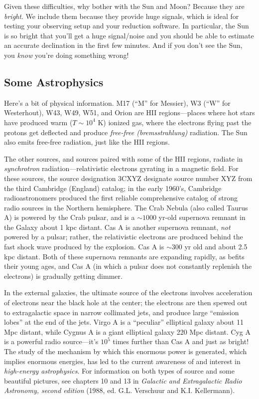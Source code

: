 \documentclass[11pt,preprint]{aastex}
\begin{document}
	Given these difficulties, why bother with the Sun and Moon?
Because they are {\it bright}. We include them because they provide huge
signals, which is ideal for testing your observing setup and your
reduction software.  In particular, the Sun is so bright that you'll get
a huge signal/noise and you should be able to estimate an accurate
declination in the first few minutes. And if you don't see the Sun, you
{\it know} you're doing something wrong!

\subsection{Some Astrophysics}

Here's a bit of physical information.  M17 (``M'' for Messier), W3
(``W'' for Westerhout), W43, W49, W51, and Orion
are HII regions---places where hot stars have produced warm ($T \sim
10^4$ K) ionized gas, where the electrons flying past the protons get
deflected and produce {\it free-free (bremsstrahlung)} radiation.  The
Sun also emits free-free radiation, just like the HII regions.

The other sources, and sources paired with some of the HII regions,
radiate in {\it synchrotron} radiation---relativistic electrons gyrating
in a magnetic field.  For these sources, the source designation 3CXYZ
designate source number XYZ from the third Cambridge (England) catalog;
in the early 1960's, Cambridge radioastronomers produced the first
reliable comprehensive catalog of strong radio sources in the Northern
hemisphere.  The Crab Nebula (also called Taurus A) is powered by the
Crab pulsar, and is a $\sim 1000$ yr-old supernova remnant in the Galaxy
about 1 kpc distant. Cas A is another supernova remnant, {\it not}
powered by a pulsar; rather, the relativistic electrons are produced
behind the fast shock wave produced by the explosion.  Cas A is $\sim
300$ yr old and about 2.5 kpc distant.  Both of these supernova remnants
are expanding rapidly, as befits their young ages, and Cas A (in which a
pulsar does not constantly replenish the electrons) is gradually getting
dimmer.

In the external galaxies, the ultimate source of the
electrons involves acceleration of electrons near the black hole at the
center; the electrons are then spewed out to extragalactic space in
narrow collimated jets, and produce large ``emission lobes'' at the end
of the jets.  Virgo A is a ``peculiar''
elliptical galaxy about 11 Mpc distant, while Cygnus A is a giant
elliptical galaxy 220 Mpc distant.  Cyg A is a powerful radio
source---it's $10^5$ times further than Cas A and just as bright! The
study of the mechanism by which this enormous power is generated, which
implies enormous energies, has led to the current awareness of and
interest in {\it high-energy astrophysics}.
For information on both types of source and some beautiful
pictures, see chapters 10 and 13 in {\it Galactic and Extragalactic
Radio Astronomy, second edition} (1988, ed.  G.L.  Verschuur and K.I. 
Kellermann). 
\end{document}
